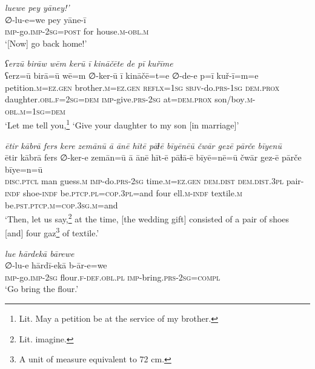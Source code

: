 \ea \label{ŽH.118}
\textit{luewe pey yāney!’} \\ 
\gll ∅-lu-e=we pey yāne-ī \\ 
 \textsc{imp-}go.\textsc{imp-}\textsc{2sg}\textsc{=\textsc{post}} for house\textsc{.m}\textsc{-obl}\textsc{.m} \\ 
\glt `[Now] go back home!'
\z 
 
\ea \label{RE.7}
\textit{ʕerzū birāw wēm kerū ī kināčēte de pī kuřīme} \\ 
\gll ʕerz=ū birā=ū wē=m ∅-ker-ū ī kināčē=t=e ∅-de-e p=ī kuř-ī=m=e \\ 
 petition\textsc{.m}\textsc{\textsc{=ez.gen}} brother\textsc{.m}\textsc{\textsc{=ez.gen}} \textsc{reflx}\textsc{=\textsc{1sg}} \textsc{sbjv-}do\textsc{.prs}\textsc{-\textsc{1sg}} \textsc{dem.prox} daughter\textsc{.obl}\textsc{.f}\textsc{=\textsc{2sg}}\textsc{=dem} \textsc{imp-}give\textsc{.prs}-\textsc{2sg} at=\textsc{dem.prox} son/boy\textsc{.m}\textsc{-obl}\textsc{.m}\textsc{=\textsc{1sg}}\textsc{=dem} \\ 
\glt `Let me tell you,\footnote{Lit. May a petition be at the service of my brother.} ‘Give your daughter to my son [in marriage]'
\z 
 
\ea \label{RE.11}
\textit{ētir kābrā fers kere zemānū ā ānē hītē pāɫē bīyēnēū čwār gezē pārče bīyenū} \\ 
\gll ētir kābrā fers ∅-ker-e zemān=ū ā ānē hīt-ē pāɫā-ē bīyē=nē=ū čwār gez-ē pārče bīye=n=ū \\ 
 \textsc{disc.ptcl} man guess\textsc{.m} \textsc{imp-}do\textsc{.prs}-\textsc{2sg} time\textsc{.m}\textsc{=ez.gen} \textsc{dem.dist} \textsc{dem.dist}\textsc{.3pl} pair\textsc{-indf} shoe\textsc{-indf} be\textsc{.ptcp}\textsc{.pl}\textsc{=cop}\textsc{.3pl}=and four ell\textsc{.m}\textsc{-indf} textile\textsc{.m} be\textsc{.pst}\textsc{.ptcp}\textsc{.m}\textsc{=cop}\textsc{.3sg}\textsc{.m}=and \\ 
\glt `Then, let us say,\footnote{Lit. imagine.} at the time, [the wedding gift] consisted of a pair of shoes [and] four gaz\footnote{A unit of measure equivalent to 72 cm.} of textile.'
\z 
 
\ea \label{RE.19}
\textit{lue hārdekā bārewe} \\ 
\gll ∅-lu-e hārdī-ekā b-ār-e=we \\ 
 \textsc{imp-}go.\textsc{imp-}\textsc{2sg} flour\textsc{.f}\textsc{-def}\textsc{.obl}\textsc{.pl} \textsc{imp-}bring\textsc{.prs}-\textsc{2sg}\textsc{=compl} \\ 
\glt `Go bring the flour.'
\z 
 

